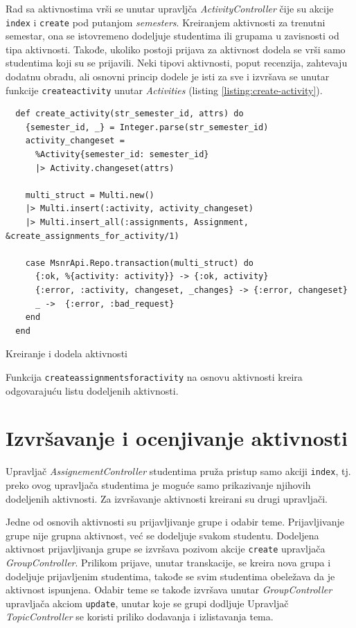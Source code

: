 \documentclass[12pt,oneside]{memoir}
\begin{document}
Rad sa aktivnostima vrši se unutar upravljča \emph{ActivityController} čije su akcije \texttt{index} i \texttt{create}
pod putanjom \emph{semesters}. Kreiranjem aktivnosti za trenutni semestar, ona se istovremeno dodeljuje studentima ili
grupama u zavisnosti od tipa aktivnosti. Takođe, ukoliko postoji prijava za aktivnost dodela se vrši samo studentima koji su
se prijavili. Neki tipovi aktivnosti, poput recenzija, zahtevaju dodatnu obradu, ali osnovni princip dodele je isti za sve i
izvršava se unutar funkcije \texttt{create{\textunderscore}activity}  unutar \emph{Activities} (listing \ref{listing:create-activity}). 
\begin{listing}[h!]
\begin{verbatim}
  def create_activity(str_semester_id, attrs) do
    {semester_id, _} = Integer.parse(str_semester_id)
    activity_changeset =
      %Activity{semester_id: semester_id}
      |> Activity.changeset(attrs)

    multi_struct = Multi.new()
    |> Multi.insert(:activity, activity_changeset)
    |> Multi.insert_all(:assignments, Assignment, &create_assignments_for_activity/1)

    case MsnrApi.Repo.transaction(multi_struct) do
      {:ok, %{activity: activity}} -> {:ok, activity}
      {:error, :activity, changeset, _changes} -> {:error, changeset}
      _ ->  {:error, :bad_request}
    end
  end
\end{verbatim}
\caption{Kreiranje i dodela aktivnosti}
\label{listing:create-activity}
\end{listing}

Funkcija \texttt{create{\textunderscore}assignments{\textunderscore}for{\textunderscore}activity} na osnovu aktivnosti
kreira odgovarajuću listu dodeljenih aktivnosti.
\section{Izvršavanje i ocenjivanje aktivnosti}

Upravljač \emph{AssignementController} studentima pruža pristup samo akciji \texttt{index}, tj. preko ovog upravljača
studentima je moguće samo prikazivanje njihovih dodeljenih aktivnosti. Za izvršavanje aktivnosti kreirani su drugi upravljači.

Jedne od osnovih aktivnosti su prijavljivanje grupe i odabir teme. Prijavljivanje grupe nije grupna aktivnost, već se dodeljuje svakom
studentu. Dodeljena aktivnost prijavljivanja grupe se izvršava pozivom akcije \texttt{create} upravljača \emph{GroupController}.
Prilikom prijave, unutar transkacije, se kreira nova grupa i dodeljuje prijavljenim studentima, takođe se svim studentima
obeležava da je aktivnost ispunjena. Odabir teme se takođe izvršava unutar \emph{GroupController} upravljača akciom
\texttt{update}, unutar koje se grupi dodljuje  Upravljač \emph{TopicController} se koristi priliko dodavanja i izlistavanja tema.
\end{document}
